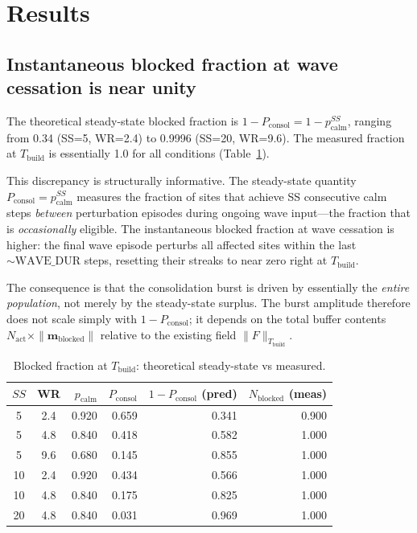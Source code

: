 \documentclass[11pt]{article}
\begin{document}
\section{Results}

\subsection{Instantaneous blocked fraction at wave cessation is near unity}

The theoretical steady-state blocked fraction is $1 - P_{\mathrm{consol}} = 1 - p_{\mathrm{calm}}^{SS}$,
ranging from 0.34 (SS=5, WR=2.4) to 0.9996 (SS=20, WR=9.6).
The measured fraction at $T_{\mathrm{build}}$ is essentially 1.0 for all conditions
(Table~\ref{tab:blocked}).

This discrepancy is structurally informative.
The steady-state quantity $P_{\mathrm{consol}} = p_{\mathrm{calm}}^{SS}$ measures
the fraction of sites that achieve SS consecutive calm steps \emph{between}
perturbation episodes during ongoing wave input---the fraction that is
\emph{occasionally} eligible.
The instantaneous blocked fraction at wave cessation is higher:
the final wave episode perturbs all affected sites within the last $\sim\mathrm{WAVE\_DUR}$ steps,
resetting their streaks to near zero right at $T_{\mathrm{build}}$.

The consequence is that the consolidation burst is driven by essentially the
\emph{entire population}, not merely by the steady-state surplus.
The burst amplitude therefore does not scale simply with $1 - P_{\mathrm{consol}}$;
it depends on the total buffer contents $N_{\mathrm{act}} \times \|\mathbf{m}_{\mathrm{blocked}}\|$
relative to the existing field $\|F\|_{T_{\mathrm{build}}}$.

\begin{table}[ht]
\centering
\caption{Blocked fraction at $T_{\mathrm{build}}$: theoretical steady-state vs measured.}
\label{tab:blocked}
\begin{tabular}{ccrrrr}
\toprule
$SS$ & WR & $p_{\mathrm{calm}}$ & $P_{\mathrm{consol}}$ & $1 - P_{\mathrm{consol}}$ (pred) & $N_{\mathrm{blocked}}$ (meas) \\
\midrule
 5 & 2.4 & 0.920 & 0.659 & 0.341 & 0.900 \\
 5 & 4.8 & 0.840 & 0.418 & 0.582 & 1.000 \\
 5 & 9.6 & 0.680 & 0.145 & 0.855 & 1.000 \\
10 & 2.4 & 0.920 & 0.434 & 0.566 & 1.000 \\
10 & 4.8 & 0.840 & 0.175 & 0.825 & 1.000 \\
20 & 4.8 & 0.840 & 0.031 & 0.969 & 1.000 \\
\bottomrule
\end{tabular}
\end{table}
\end{document}
